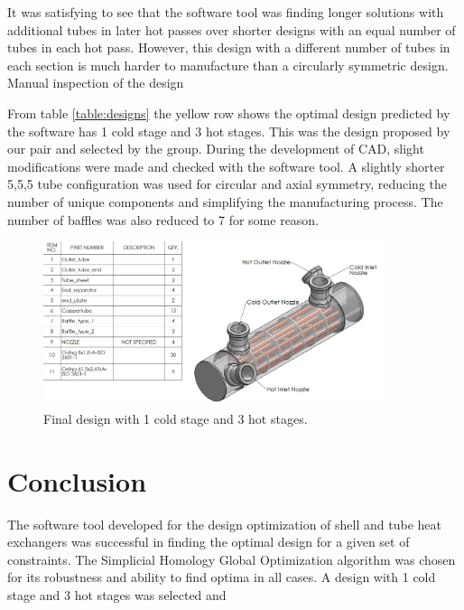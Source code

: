 \documentclass{article}
\begin{document}
It was satisfying to see that the software tool was finding longer solutions with additional tubes in later hot passes over shorter designs with an equal number of tubes in each hot pass.
However, this design with a different number of tubes in each section is much harder to manufacture than a circularly symmetric design.
Manual inspection of the design 

From table \ref{table:designs} the yellow row shows the optimal design predicted by the software has 1 cold stage and 3 hot stages.
This was the design proposed by our pair and selected by the group.
During the development of CAD, slight modifications were made and checked with the software tool.
A slightly shorter 5,5,5 tube configuration was used for circular and axial symmetry, reducing the number of unique components and simplifying the manufacturing process.
The number of baffles was also reduced to 7 for some reason. %


\begin{figure}[H]
  \centering
  \includegraphics[width=0.9\textwidth]{final.png}
  \caption{Final design with 1 cold stage and 3 hot stages.}
  \label{fig:final_design}
\end{figure}

\section{Conclusion}

The software tool developed for the design optimization of shell and tube heat exchangers was successful in finding the optimal design for a given set of constraints.
The Simplicial Homology Global Optimization algorithm was chosen for its robustness and ability to find optima in all cases.
A design with 1 cold stage and 3 hot stages was selected and 


\end{document}
